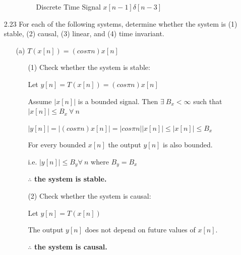 \documentclass[fleqn]{article}
\begin{document}
\begin{enumerate}[nolistsep]
\begin{enumerate}[nolistsep]
		\begin{figure}[H]
			\centerline{}
		\caption{Discrete Time Signal $x[n-1]\delta[n-3]$}
		\label{part_e}
		\end{figure}
		
		\end{enumerate}
		
		\item[2.23] For each of the following systems, determine whether the system is (1) stable, (2) causal, (3) linear, and (4) time invariant.
		
		\begin{enumerate}[nolistsep]
			\item[(a)] $T(x[n]) = (cos{\pi}n)x[n]$
			
				\begin{enumerate}[nolistsep]
				
					\item[(1)] Check whether the system is stable:
			
					Let $y[n] = T(x[n]) = (cos{\pi}n)x[n]$
			
					Assume $|x[n]|$ is a bounded signal. Then $\exists\ B_x < \infty$ such that  $|x[n]| \leq B_x\ \forall\ n$
			
					$|y[n]| = |(cos{\pi}n)x[n]| = |cos{\pi}n||x[n]| \leq |x[n]| \leq B_x$
			
					For every bounded $x[n]$ the output $y[n]$ is also bounded.
					
					i.e. $|y[n]| \leq B_y \forall\ n$ where $B_y = B_x$					
			
					\textbf{$\mathbf{\therefore}$ the system is stable.}
					
					\item[(2)] Check whether the system is causal:
					
					Let $y[n] = T(x[n])$
					
					The output $y[n]$ does not depend on future values of $x[n]$.
					
					\textbf{$\mathbf{\therefore}$ the system is causal.}
					

\end{enumerate}
\end{enumerate}
\end{enumerate}
\end{document}
